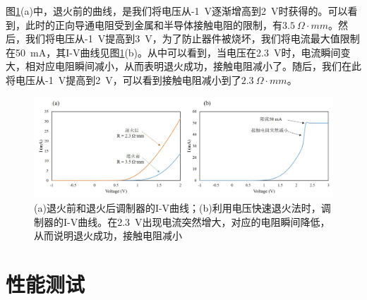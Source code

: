 图\ref{chapt4_3D_resist}(a)中，退火前的曲线，是我们将电压从-1~V逐渐增高到2~V时获得的。可以看到，此时的正向导通电阻受到金属和半导体接触电阻的限制，有$3.5~ \Omega \cdot mm$。然后，我们将电压从-1~V提高到3~V，为了防止器件被烧坏，我们将电流最大值限制在50~mA，其I-V曲线见图\ref{chapt4_3D_resist}(b)。从中可以看到，当电压在2.3~V时，电流瞬间变大，相对应电阻瞬间减小，从而表明退火成功，接触电阻减小了。随后，我们在此将电压从-1~V提高到2~V，可以看到接触电阻减小到了$2.3~ \Omega \cdot mm$。
\begin{figure}[htb]
	\centering
	\includegraphics[width=15cm]{./Pictures/chapt4_3D_resist.jpg}
	\caption{(a)退火前和退火后调制器的I-V曲线；(b)利用电压快速退火法时，调制器的I-V曲线。在2.3~V出现电流突然增大，对应的电阻瞬间降低，从而说明退火成功，接触电阻减小}
	\label{chapt4_3D_resist}
\end{figure}
\section{性能测试}
